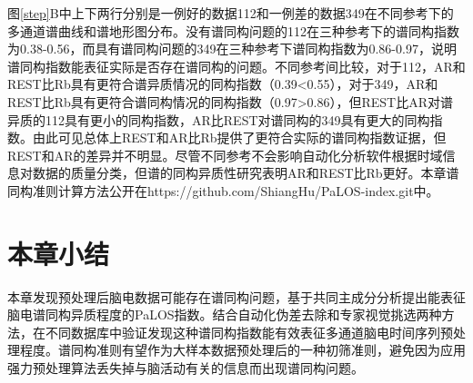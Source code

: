 图\ref{step}B中上下两行分别是一例好的数据112和一例差的数据349在不同参考下的多通道谱曲线和谱地形图分布。没有谱同构问题的112在三种参考下的谱同构指数为0.38-0.56，而具有谱同构问题的349在三种参考下谱同构指数为0.86-0.97，说明谱同构指数能表征实际是否存在谱同构的问题。不同参考间比较，对于112，AR和REST比Rb具有更符合谱异质情况的同构指数（0.39<0.55），对于349，AR和REST比Rb具有更符合谱同构情况的同构指数（0.97>0.86），但REST比AR对谱异质的112具有更小的同构指数，AR比REST对谱同构的349具有更大的同构指数。由此可见总体上REST和AR比Rb提供了更符合实际的谱同构指数证据，但REST和AR的差异并不明显。尽管不同参考不会影响自动化分析软件根据时域信息对数据的质量分类，但谱的同构异质性研究表明AR和REST比Rb更好。本章谱同构准则计算方法公开在https://github.com/ShiangHu/PaLOS-index.git中。

\section{本章小结}
本章发现预处理后脑电数据可能存在谱同构问题，基于共同主成分分析提出能表征脑电谱同构异质程度的PaLOS指数。结合自动化伪差去除和专家视觉挑选两种方法，在不同数据库中验证发现这种谱同构指数能有效表征多通道脑电时间序列预处理程度。谱同构准则有望作为大样本数据预处理后的一种初筛准则，避免因为应用强力预处理算法丢失掉与脑活动有关的信息而出现谱同构问题。